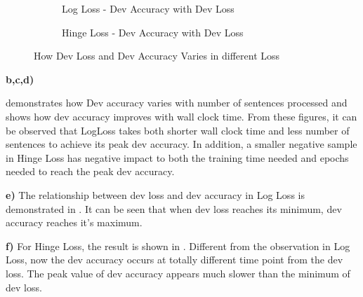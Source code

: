 \documentclass{article}
\begin{document}
\begin{figure}
\centering
\begin{subfigure}{0.45\textwidth}
\caption{Log Loss - Dev Accuracy with Dev Loss}
\label{fig:logloss_acc_loss}
\end{subfigure}
\begin{subfigure}{0.45\textwidth}
\caption{Hinge Loss - Dev Accuracy with Dev Loss}
\label{fig:hingeloss_acc_loss}
\end{subfigure}
\caption{How Dev Loss and Dev Accuracy Varies in different Loss}
\end{figure}

\textbf{b,c,d)} 

 demonstrates how Dev accuracy varies with number of sentences processed and  shows how dev accuracy improves with wall clock time. From these figures, it can be observed that LogLoss takes both shorter wall clock time and less number of sentences to achieve its peak dev accuracy. In addition, a smaller negative sample in Hinge Loss has negative impact to both the training time needed and epochs needed to reach the peak dev accuracy.


\textbf{e)}
The relationship between dev loss and dev accuracy in Log Loss is demonstrated in . It can be seen that when dev loss reaches its minimum, dev accuracy reaches it's maximum.


\textbf{f)}
For Hinge Loss, the result is shown in . Different from the observation in Log Loss, now the dev accuracy occurs at totally different time point from the dev loss. The peak value of dev accuracy appears much slower than the minimum of dev loss.
\end{document}
